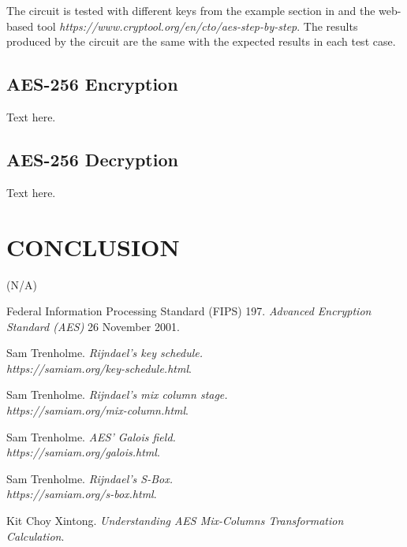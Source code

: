 \documentclass[a4paper, 10pt]{article}
\begin{document}
\begin{multicols}{2}
        The circuit is tested with different keys from the example section in \cite{AES} and the web-based tool \textit{https://www.cryptool.org/en/cto/aes-step-by-step}. The results produced by the circuit are the same with the expected results in each test case.

        \subsection{AES-256 Encryption}

        Text here.

        \subsection{AES-256 Decryption}

        Text here.

        \section{CONCLUSION}

        (N/A)

        \begin{thebibliography}{3}
            Federal Information Processing Standard (FIPS) 197.
            \textit{Advanced Encryption Standard (AES)}
            26 November 2001.

            Sam Trenholme.
            \textit{Rijndael's key schedule.\\https://samiam.org/key-schedule.html}.

            Sam Trenholme.
            \textit{Rijndael's mix column stage.\\https://samiam.org/mix-column.html}.

            Sam Trenholme.
            \textit{AES' Galois field.\\https://samiam.org/galois.html}.

            Sam Trenholme.
            \textit{Rijndael's S-Box.\\https://samiam.org/s-box.html}.

            Kit Choy Xintong.
            \textit{Understanding AES Mix-Columns Transformation Calculation}.
        \end{thebibliography}

    \end{multicols}
\end{document}
